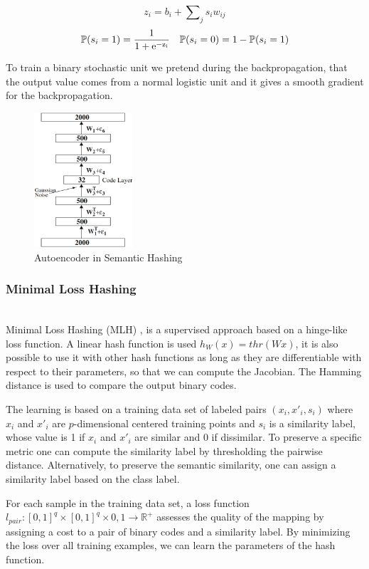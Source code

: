 \[z_i=b_i+\sum\nolimits_{j}s_{i}w_{ij}\]
\begin{align*}
\mathbb{P}(s_i=1)=\frac{1}{1+\rm{e}^{-z_i}} && \mathbb{P}(s_i=0)=1-\mathbb{P}(s_i=1)
\end{align*}

To train a binary stochastic unit we pretend during the backpropagation, that the output value comes from a normal logistic unit and it gives a smooth gradient for the backpropagation.

\begin{figure}
	\includegraphics[height=5cm]{auto_encoder.png}
	\caption{Autoencoder in Semantic Hashing}
	\label{fig:auto_encoder}
\end{figure}

\subsubsection{Minimal Loss Hashing}
~\\
Minimal Loss Hashing (MLH) \cite{norouzi2011minimal},\cite{norouzi2016} is a supervised approach based on a hinge-like loss function. A linear hash function is used $h_W(x)=thr(Wx)$, it is also possible to use it with other hash functions as long as they are differentiable with respect to their parameters, so that we can compute the Jacobian. The Hamming distance is used to compare the output binary codes.

The learning is based on a training data set of labeled pairs $(x_i, x'_i, s_i)$ where $x_i$ and $x'_i$ are $p$-dimensional centered training points and $s_i$ is a similarity label, whose value is 1 if $x_i$ and $x'_i$ are similar and 0 if dissimilar. To preserve a specific metric one can compute the similarity label by thresholding the pairwise distance. Alternatively, to preserve the semantic similarity, one can assign a similarity label based on the class label.

For each sample in the training data set, a loss function $l_{pair}: [0, 1]^{q}\times[0, 1]^{q}\times{0, 1}\rightarrow\mathbb{R}^{+}$ assesses the quality of the mapping by assigning a cost to a pair of binary codes and a similarity label. By minimizing the loss over all training examples, we can learn the parameters of the hash function.

